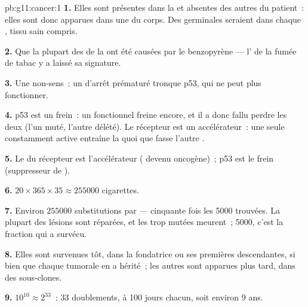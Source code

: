 \begin{solution}{pb:g11:cancer:1}
\textbf{1.} Elles sont présentes dans la  et absentes des autres
 du patient~: elles sont donc apparues dans une  du
corps. Des  germinales seraient dans chaque , tissu
sain compris.

\textbf{2.} Que la plupart des  de la  ont été causées
par le benzopyrène --- l' de la fumée de tabac y a laissé
sa signature.

\textbf{3.} Une  non-sens~: un  d'arrêt prématuré tronque
p53, qui ne peut plus fonctionner.

\textbf{4.} p53 est un frein~: un  fonctionnel freine encore, et
il a donc fallu perdre les deux (l'un muté, l'autre délété). Le
récepteur est un accélérateur~: une seule  constamment active
entraîne la  quoi que fasse l'autre .

\textbf{5.} Le  du récepteur est l'accélérateur (
devenu oncogène)~; p53 est le frein (suppresseur de ).

\textbf{6.} $20 \times 365 \times 35 \approx \num{255000}$ cigarettes.

\textbf{7.} Environ $\num{255000}$ substitutions par  ---
cinquante fois les 5000 trouvées. La plupart des lésions sont réparées,
et les  trop mutées meurent~; 5000, c'est la fraction qui a
survécu.

\textbf{8.} Elles sont survenues tôt, dans la  fondatrice ou ses
premières descendantes, si bien que chaque  tumorale en a
hérité~; les autres sont apparues plus tard, dans des sous-clones.

\textbf{9.} $10^{10} \approx 2^{33}$~: 33 doublements, à 100 jours
chacun, soit environ 9 ans.


\end{solution}
